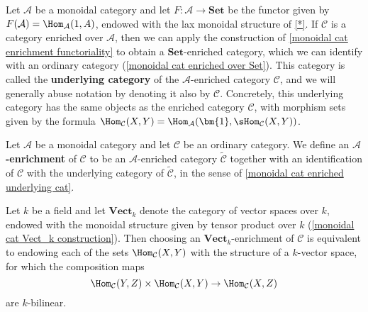 \begin{example}\label{monoidal cat enriched underlying cat}
Let $\mathcal{A}$ be a monoidal category and let $F:\mathcal{A}\to\mathbf{Set}$ be the functor given by $F(\mathcal{A})=\Hom_{\mathcal{A}}(1,A)$, endowed with the lax monoidal structure of \cref{*}. If $\mathcal{C}$ is a category enriched over $\mathcal{A}$, then we can apply the construction of \cref{monoidal cat enrichment functoriality} to obtain a $\mathbf{Set}$-enriched category, which we can identify with an ordinary category (\cref{monoidal cat enriched over Set}). This category is called the \textbf{underlying category} of the $\mathcal{A}$-enriched category $\mathcal{C}$, and we will generally abuse notation by denoting it also by $\mathcal{C}$. Concretely, this underlying category has the same objects as the enriched category $\mathcal{C}$, with morphism sets given by the formula $\Hom_{\mathcal{C}}(X,Y)=\Hom_{\mathcal{A}}(\bm{1},\sHom_{\mathcal{C}}(X,Y))$.
\end{example}
\begin{remark}
Let $\mathcal{A}$ be a monoidal category and let $\mathcal{C}$ be an ordinary category. We define an \textbf{$\mathcal{A}$-enrichment} of $\mathcal{C}$ to be an $\mathcal{A}$-enriched category $\widetilde{\mathcal{C}}$ together with an identification of $\mathcal{C}$ with the underlying category of $\widetilde{\mathcal{C}}$, in the sense of \cref{monoidal cat enriched underlying cat}.
\end{remark}
\begin{example}
Let $k$ be a field and let $\mathbf{Vect}_k$ denote the category of vector spaces over $k$, endowed with the monoidal structure given by tensor product over $k$ (\cref{monoidal cat Vect_k construction}). Then choosing an $\mathbf{Vect}_k$-enrichment of $\mathcal{C}$ is equivalent to endowing each of the sets $\Hom_{\mathcal{C}}(X,Y)$ with the structure of a $k$-vector space, for which the composition maps
\[\Hom_{\mathcal{C}}(Y,Z)\times\Hom_{\mathcal{C}}(X,Y)\to\Hom_{\mathcal{C}}(X,Z)\]
are $k$-bilinear.
\end{example}
